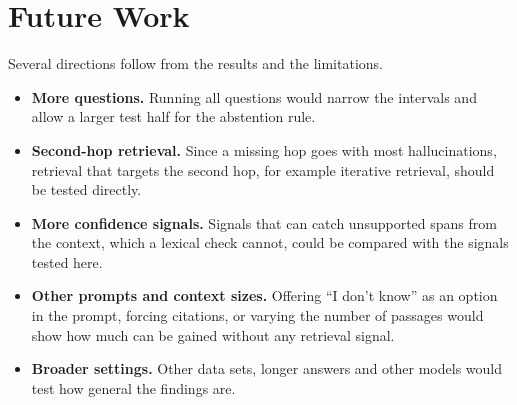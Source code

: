 \section{Future Work}
Several directions follow from the results and the limitations.
\begin{itemize}
\item \textbf{More questions.} Running all  questions would narrow the intervals and allow a
  larger test half for the abstention rule.
\item \textbf{Second-hop retrieval.} Since a missing hop goes with most hallucinations, retrieval that targets the second hop,
  for example iterative retrieval, should be tested directly.
\item \textbf{More confidence signals.} Signals that can catch unsupported spans from the context, which a lexical check cannot,
  could be compared with the signals tested here.
\item \textbf{Other prompts and context sizes.} Offering ``I don't know'' as an option in the prompt, forcing
  citations, or varying the number of passages would show how much can be gained without any retrieval signal.
\item \textbf{Broader settings.} Other data sets, longer answers and other models would test how general the
  findings are.
\end{itemize}
